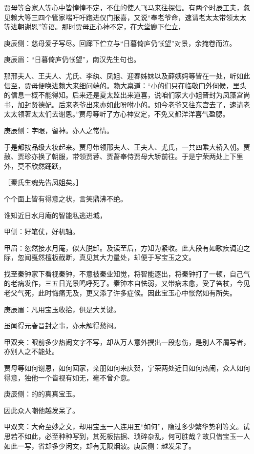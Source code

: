 \begin{parag}
    贾母等合家人等心中皆惶惶不定，不住的使人飞马来往探信。有两个时辰工夫，忽见赖大等三四个管家喘吁吁跑进仪门报喜，又说“奉老爷命，速请老太太带领太太等进朝谢恩”等语。那时贾母正心神不定，在大堂廊下伫立，\begin{note}庚辰侧：慈母爱子写尽。回廊下伫立与“日暮倚庐仍怅望”对景，余掩卷而泣。\end{note}\begin{note}庚辰眉：“日暮倚庐仍怅望”，南汉先生句也。\end{note}那邢夫人、王夫人、尤氏、李纨、凤姐、迎春姊妹以及薛姨妈等皆在一处，听如此信至，贾母便唤进赖大来细问端的。赖大禀道：“小的们只在临敬门外伺候，里头的信息一概不能得知。后来还是夏太监出来道喜，说咱们家大小姐晋封为凤藻宫尚书，加封贤德妃。后来老爷出来亦如此吩咐小的。如今老爷又往东宫去了，速请老太太领著太太们去谢恩。”贾母等听了方心神安定，不免又都洋洋喜气盈腮。\begin{note}庚辰侧：字眼，留神。亦人之常情。\end{note}于是都按品级大妆起来。贾母带领邢夫人、王夫人、尤氏，一共四乘大轿入朝。贾赦、贾珍亦换了朝服，带领贾蓉、贾蔷奉侍贾母大轿前往。于是宁荣两处上下里外，莫不欣然踊跃，\begin{note}［秦氏生魂先告凤姐矣。］\end{note}个个面上皆有得意之状，言笑鼎沸不绝。
\end{parag}


\begin{parag}
    谁知近日水月庵的智能私逃进城，\begin{note}甲侧：好笔仗，好机轴。\end{note}\begin{note}甲眉：忽然接水月庵，似大脱卸。及读至后，方知为紧收。此大段有如歌疾调迫之际，忽闻戛然檀板截断，真见其大力量处，却便于写宝玉之文。\end{note}找至秦钟家下看视秦钟，不意被秦业知觉，将智能逐出，将秦钟打了一顿，自己气的老病发作，三五日光景鸣呼死了。秦钟本自怯弱，又带病未愈，受了笞杖，今见老父气死，此时悔痛无及，更又添了许多症候。因此宝玉心中怅然如有所失。\begin{note}庚辰眉：凡用宝玉收拾，俱是大关键。\end{note}虽闻得元春晋封之事，亦未解得愁闷。\begin{note}甲双夹：眼前多少热闹文字不写，却从万人意外撰出一段悲伤，是别人不屑写者，亦别人之不能处。\end{note}贾母等如何谢恩，如何回家，亲朋如何来庆贺，宁荣两处近日如何热闹，众人如何得意，独他一个皆视有如无，毫不曾介意。\begin{note}庚辰侧：的的真真宝玉。\end{note}因此众人嘲他越发呆了。\begin{note}甲双夹：大奇至妙之文，却用宝玉一人连用五“如何”，隐过多少繁华势利等文。试思若不如此，必至种种写到，其死板拮据、琐碎杂乱，何可胜哉？故只借宝玉一人如此一写，省却多少闲文，却有无限烟波。庚辰侧：越发呆了。\end{note}
\end{parag}


